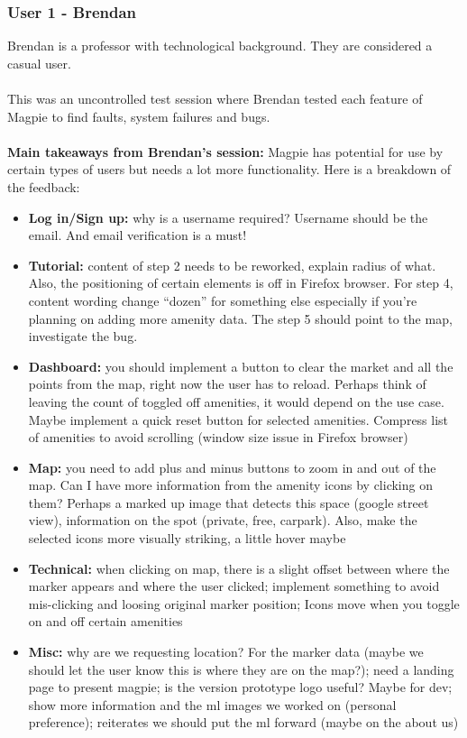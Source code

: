 \newpage
\subsubsection{User 1 - Brendan}
Brendan is a professor with technological background. They are considered a casual user.\\\\
This was an uncontrolled test session where Brendan tested each feature of Magpie to find faults, system failures and bugs.\\\\
\textbf{Main takeaways from Brendan's session: }Magpie has potential for use by certain types of users but needs a lot more functionality. Here is a breakdown of the feedback:
\begin{itemize}
    \item \textbf{Log in/Sign up: }why is a username required? Username should be the email. And email verification is a must!
    \item \textbf{Tutorial: }content of step 2 needs to be reworked, explain radius of what. Also, the positioning of certain elements is off in Firefox browser. For step 4, content wording change “dozen” for something else especially if you're planning on adding more amenity data. The step 5 should point to the map, investigate the bug.
    \item \textbf{Dashboard: }you should implement a button to clear the market and all the points from the map, right now the user has to reload. Perhaps think of leaving the count of toggled off amenities, it would depend on the use case. Maybe implement a quick reset button for  selected amenities. Compress list of amenities to avoid scrolling (window size issue in Firefox browser)
    \item \textbf{Map: } you need to add plus and minus buttons to zoom in and out of the map. Can I have more information from the amenity icons by clicking on them? Perhaps a marked up image that detects this space (google street view), information on the spot (private, free, carpark). Also, make the selected icons more visually striking, a little hover maybe
    \item \textbf{Technical: }when clicking on map, there is a slight offset between where the marker appears and where the user clicked; implement something to avoid mis-clicking and loosing original marker position; Icons move when you toggle on and off certain amenities
    \item \textbf{Misc: }why are we requesting location? For the marker data (maybe we should let the user know this is where they are on the map?); need a landing page to present magpie; is the version prototype logo useful? Maybe for dev; show more information and the ml images we worked on (personal preference); reiterates we should put the ml forward (maybe on the about us)
\end{itemize}
